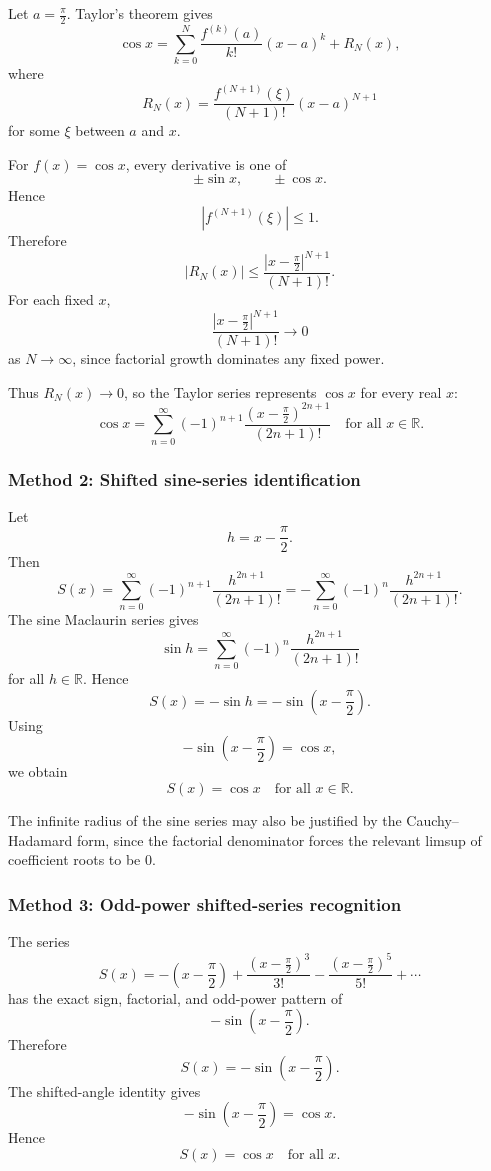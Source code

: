 \documentclass[12pt]{article}
\newcommand{\R}{\mathbb{R}}
\begin{document}
Let \(a=\frac{\pi}{2}\). Taylor's theorem gives
\[
\cos x
=
\sum_{k=0}^{N}\frac{f^{(k)}(a)}{k!}(x-a)^k
+
R_N(x),
\]
where
\[
R_N(x)=\frac{f^{(N+1)}(\xi)}{(N+1)!}(x-a)^{N+1}
\]
for some \(\xi\) between \(a\) and \(x\).

For \(f(x)=\cos x\), every derivative is one of
\[
\pm \sin x,\qquad \pm \cos x.
\]
Hence
\[
|f^{(N+1)}(\xi)|\le 1.
\]
Therefore
\[
|R_N(x)|
\le
\frac{\left|x-\frac{\pi}{2}\right|^{N+1}}{(N+1)!}.
\]
For each fixed \(x\),
\[
\frac{\left|x-\frac{\pi}{2}\right|^{N+1}}{(N+1)!}\to 0
\]
as \(N\to\infty\), since factorial growth dominates any fixed power.

Thus \(R_N(x)\to 0\), so the Taylor series represents \(\cos x\) for every real \(x\):
\[
\boxed{
\cos x=
\sum_{n=0}^{\infty}(-1)^{n+1}
\frac{\left(x-\frac{\pi}{2}\right)^{2n+1}}{(2n+1)!}
\quad \text{for all }x\in\R.
}
\]

\newpage
\subsubsection{Method 2: Shifted sine-series identification}

Let
\[
h=x-\frac{\pi}{2}.
\]
Then
\[
S(x)
=
\sum_{n=0}^{\infty}(-1)^{n+1}\frac{h^{2n+1}}{(2n+1)!}
=
-\sum_{n=0}^{\infty}(-1)^n\frac{h^{2n+1}}{(2n+1)!}.
\]
The sine Maclaurin series gives
\[
\sin h=\sum_{n=0}^{\infty}(-1)^n\frac{h^{2n+1}}{(2n+1)!}
\]
for all \(h\in\R\). Hence
\[
S(x)=-\sin h=-\sin\left(x-\frac{\pi}{2}\right).
\]
Using
\[
-\sin\left(x-\frac{\pi}{2}\right)=\cos x,
\]
we obtain
\[
\boxed{S(x)=\cos x\quad\text{for all }x\in\R.}
\]

The infinite radius of the sine series may also be justified by the Cauchy--Hadamard form,
since the factorial denominator forces the relevant limsup of coefficient roots to be \(0\).

\newpage
\subsubsection{Method 3: Odd-power shifted-series recognition}

The series
\[
S(x)=
-\left(x-\frac{\pi}{2}\right)
+
\frac{\left(x-\frac{\pi}{2}\right)^3}{3!}
-
\frac{\left(x-\frac{\pi}{2}\right)^5}{5!}
+\cdots
\]
has the exact sign, factorial, and odd-power pattern of
\[
-\sin\left(x-\frac{\pi}{2}\right).
\]
Therefore
\[
S(x)=-\sin\left(x-\frac{\pi}{2}\right).
\]
The shifted-angle identity gives
\[
-\sin\left(x-\frac{\pi}{2}\right)=\cos x.
\]
Hence
\[
\boxed{S(x)=\cos x\quad\text{for all }x.}
\]
\end{document}
